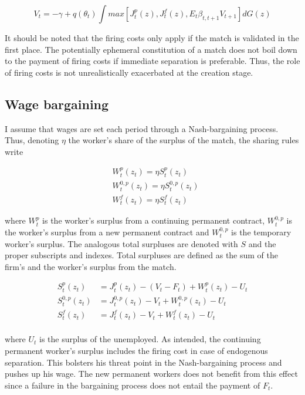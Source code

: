 \documentclass[a4paper]{article}
\begin{document}
\begin{equation*}
V_t = - \gamma + q \left( \theta_{t} \right) \int max \left[ J_{t}^{p} \left( z \right) , J_{t}^{f} \left( z \right) ,  E_{t} \beta_{t,t+1} V_{t+1} \right] dG(z)
\end{equation*}

It should be noted that the firing costs only apply if the match is validated in the first place. The potentially ephemeral constitution of a match does not boil down to the payment of firing costs if immediate separation is preferable. Thus, the role of firing costs is not unrealistically exacerbated at the creation stage.  

\subsection{Wage bargaining}

I assume that wages are set each period through a Nash-bargaining process. Thus, denoting $\eta$ the worker's share of the surplus of the match, the sharing rules write

\begin{align*}
&W_t^p \left( z_t \right) = \eta S_t^p \left( z_t \right)\\
&W_t^{0,p} \left( z_t \right) = \eta S_t^{0,p} \left( z_t \right)\\
&W_t^f \left( z_t \right) = \eta S_t^f \left( z_t \right)
\end{align*}

where $W_t^p$ is the worker's surplus from a continuing permanent contract, $W_t^{0,p}$ is the worker's surplus from a new permanent contract and $W_t^{0,p}$ is the temporary worker's surplus. The analogous total surpluses are denoted with $S$ and the proper subscripts and indexes. Total surpluses are defined as the sum of the firm's and the worker's surplus from the match.

\begin{align*}
S_t^p \left( z_t \right) &= J_t^p \left( z_t \right) - \left( V_t - F_t \right) + W_t^p \left( z_t \right) - U_t\\
S_t^{0,p} \left( z_t \right) &= J_t^{0,p} \left( z_t \right) - V_t + W_t^{0,p} \left( z_t \right) - U_t\\
S_t^{f} \left( z_t \right) &= J_t^{f} \left( z_t \right) - V_t + W_t^{f} \left( z_t \right) - U_t\\
\end{align*}

where $U_t$ is the surplus of the unemployed. As intended, the continuing permanent worker's surplus includes the firing cost in case of endogenous separation. This bolsters his threat point in the Nash-bargaining process and pushes up his wage. The new permanent workers does not benefit from this effect since a failure in the bargaining process does not entail the payment of $F_t$.
\end{document}
